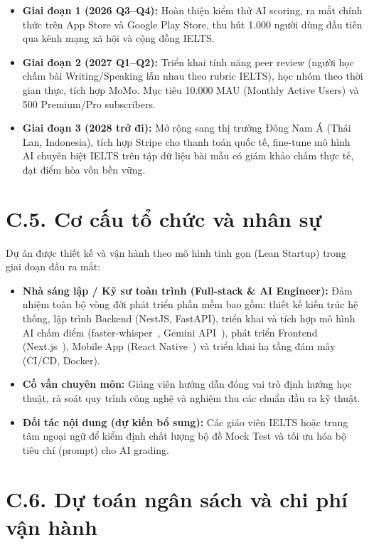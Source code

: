 \begin{itemize}
    \item \textbf{Giai đoạn 1 (2026 Q3--Q4):} Hoàn thiện kiểm thử AI scoring, ra mắt chính thức trên App Store và Google Play Store, thu hút 1.000 người dùng đầu tiên qua kênh mạng xã hội và cộng đồng IELTS.

    \item \textbf{Giai đoạn 2 (2027 Q1--Q2):} Triển khai tính năng peer review (người học chấm bài Writing/Speaking lẫn nhau theo rubric IELTS), học nhóm theo thời gian thực, tích hợp MoMo. Mục tiêu 10.000 MAU (Monthly Active Users) và 500 Premium/Pro subscribers.

    \item \textbf{Giai đoạn 3 (2028 trở đi):} Mở rộng sang thị trường Đông Nam Á (Thái Lan, Indonesia), tích hợp Stripe cho thanh toán quốc tế, fine-tune mô hình AI chuyên biệt IELTS trên tập dữ liệu bài mẫu có giám khảo chấm thực tế, đạt điểm hòa vốn bền vững.
\end{itemize}

\section*{C.5. Cơ cấu tổ chức và nhân sự}

Dự án được thiết kế và vận hành theo mô hình tinh gọn (Lean Startup) trong giai đoạn đầu ra mắt:
\begin{itemize}
    \item \textbf{Nhà sáng lập / Kỹ sư toàn trình (Full-stack \& AI Engineer):} Đảm nhiệm toàn bộ vòng đời phát triển phần mềm bao gồm: thiết kế kiến trúc hệ thống, lập trình Backend (NestJS, FastAPI), triển khai và tích hợp mô hình AI chấm điểm (faster-whisper~\cite{faster-whisper-docs}, Gemini API~\cite{gemini-api}), phát triển Frontend (Next.js~\cite{nextjs-docs}), Mobile App (React Native~\cite{reactnative-docs}) và triển khai hạ tầng đám mây (CI/CD, Docker).
    \item \textbf{Cố vấn chuyên môn:} Giảng viên hướng dẫn đóng vai trò định hướng học thuật, rà soát quy trình công nghệ và nghiệm thu các chuẩn đầu ra kỹ thuật.
    \item \textbf{Đối tác nội dung (dự kiến bổ sung):} Các giáo viên IELTS hoặc trung tâm ngoại ngữ để kiểm định chất lượng bộ đề Mock Test và tối ưu hóa bộ tiêu chí (prompt) cho AI grading.
\end{itemize}

\section*{C.6. Dự toán ngân sách và chi phí vận hành}

